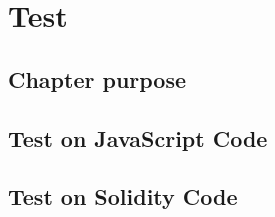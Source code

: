 \documentclass[ManualeSviluppatore.tex]{subfiles}
\begin{document}
\chapter{Test}
\section{Chapter purpose}


\section{Test on JavaScript Code}


\section{Test on Solidity Code}
\end{document}
